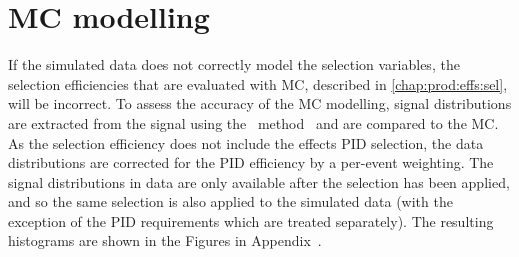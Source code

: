 \begin{table}
  \caption{%
    Relative uncertainty on the \PDzero cross-section, in \PDzero \pTy\ bins, 
    due to the finite size of the Monte Carlo sample used to assess the 
    selection efficiency.
  }
  \label{tab:prod:syst:mc:stat:D0ToKpi}
  \centering
\end{table}

\section{\acl{MC} modelling}
\label{chap:prod:syst:mc}


If the simulated data does not correctly model the selection variables, the 
selection efficiencies that are evaluated with \ac{MC}, described in 
\cref{chap:prod:effs:sel}, will be incorrect.
To assess the accuracy of the \acl{MC} modelling, signal distributions are 
extracted from the signal using the \sPlot\ method~\cite{Pivk:2004ty} and are 
compared to the \ac{MC}.
As the selection efficiency does not include the effects \ac{PID} selection, the data distributions are corrected for the \ac{PID} efficiency by a per-event weighting.
The signal distributions in data are only available after the selection has been applied, and so the same selection is also applied to the simulated data (with the exception of the \ac{PID} requirements which are treated separately).
The resulting histograms are shown in the Figures in 
Appendix~\label{app:mcdata}.


